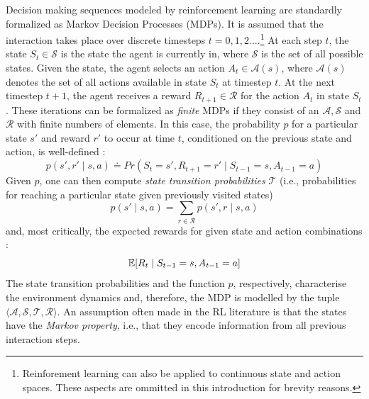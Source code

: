 Decision making sequences modeled by reinforcement learning are standardly formalized as Markov Decision Processes (MDPs). 
It is assumed that the interaction takes place over discrete timesteps $t = 0,1,2 ...$.\footnote{Reinforement learning can also be applied to continuous state and action spaces. These aspects are ommitted in this introduction for brevity reasons.} At each step $t$, the state $S_t \in \mathcal{S}$ is the state the agent is currently in, where $\mathcal{S}$ is the set of all possible states. Given the state, the agent selects an action $A_t \in \mathcal{A}(s)$, where $\mathcal{A}(s)$ denotes the set of all actions available in state $S_t$ at timestep $t$. At the next timestep $t+1$, the agent receives a reward $R_{t+1} \in \mathcal{R}$ for the action $A_t$ in state $S_t$. These iterations can be formalized as \textit{finite} MDPs if they consist of an $\mathcal{A}, \mathcal{S}$ and $\mathcal{R}$ with finite numbers of elements. In this case, the probability $p$ for a particular state $s'$ and reward $r'$ to occur at time $t$, conditioned on the previous state and action, is well-defined \parencite[][p. 48]{sutton2018reinforcement}:  
\begin{equation}
p(s', r' \mid s, a) \doteq Pr(S_t = s', R_{t+1} = r' \mid S_{t-1} = s, A_{t-1} = a)
\end{equation}
Given $p$, one can then compute \textit{state transition probabilities} $\mathcal{T}$ (i.e., probabilities for reaching a particular state given previously visited states) 
\begin{equation}
p(s' \mid s, a) = \sum_{r \in \mathcal{R} } p(s', r \mid s, a)
\end{equation}
and, most critically, the expected rewards for given state and action combinations \parencite[][p. 49]{sutton2018reinforcement}: 
\begin{equation}
\operatorname*{\mathbb{E}} [R_t \mid S_{t-1}=s, A_{t-1}=a]
\end{equation}
The state transition probabilities and the function $p$, respectively, characterise the environment dynamics and, therefore, the MDP is modelled by the tuple $\langle \mathcal{A}, \mathcal{S}, \mathcal{T}, \mathcal{R} \rangle $. An assumption often made in the RL literature is that the states have the \textit{Markov property}, i.e., that they encode information from all previous interaction steps.

